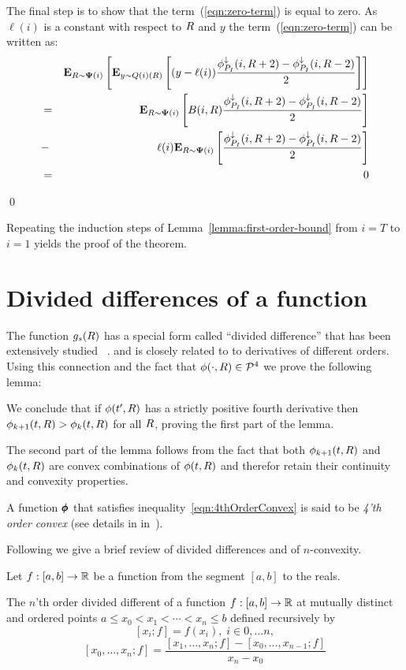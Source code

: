 \documentclass{article}[12pt]
\begin{document}
\begin{enumerate}
The final step is to show that the term~(\ref{eqn:zero-term}) is equal
to zero. As $\ell(i)$ is a constant with respect to $R$ and $y$ the
term~(\ref{eqn:zero-term}) can be written as:
\begin{eqnarray}
&&{\bf E}_{R \sim {\bf \Psi}(i)}\left[ {\bf E}_{y \sim Q(i)(R)}\left[ (y-\ell(i))
   \frac{\phi_{P_I}^{\downarrow}(i,R+2)-\phi_{P_I}^{\downarrow}(i,R-2)}{2} \right] \right]\\
&=&
{\bf E}_{R \sim {\bf \Psi}(i)}\left[ B(i,R)
    \frac{\phi_{P_I}^{\downarrow}(i,R+2)-\phi_{P_I}^{\downarrow}(i,R-2)}{2} \right]\\
  &-& \ell(i) {\bf E}_{R \sim {\bf \Psi}(i)}\left[ 
    \frac{\phi_{P_I}^{\downarrow}(i,R+2)-\phi_{P_I}^{\downarrow}(i,R-2)}{2} \right]\\
  &=& 0
\end{eqnarray}
\end{enumerate}
\qed

Repeating the induction steps of Lemma~\ref{lemma:first-order-bound}
from $i=T$ to $i=1$ yields the proof of the theorem.


\section{Divided differences of a function} \label{sec:divdiff}

The function $g_s(R)$ has a special form called ``divided difference''
that has been extensively studied ~\cite{popoviciu1965certaines,butt2016generalization, de2005divided}.
and is closely related to to derivatives of different orders. Using
this connection and the fact that $\phi(\cdot,R) \in {\cal P}^{4}$ we prove
the following lemma:


We conclude that if $\phi(t',R)$ has a strictly positive fourth
derivative then $\phi_{k+1}(t,R) > \phi_{k}(t,R)$ for all $R$, proving
the first part of the lemma.

The second part of the lemma follows from the fact that
both $\phi_{k+1}(t,R)$ and $\phi_{k}(t,R)$ are convex combinations of
$\phi(t,R)$ and therefor retain their continuity and convexity properties.

A function $\pmb{\phi}_{}$ that satisfies
inequality~\ref{eqn:4thOrderConvex} is said to be {\em 4'th order convex}
(see details in in~\cite{butt2016generalization}).


Following\cite{butt2016generalization} we give a brief review of
divided differences and of $n$-convexity.

Let $f:[a,b] \to \mathbb{R}$ be a function from the segment $[a,b]$ to the
reals.

\begin{definition}
  The $n$'th order divided different of a function $f:[a,b] \to
  \mathbb{R}$ at mutually distinct and ordered points $a \leq x_0 < x_1
  < \cdots < x_n \leq b$
  defined recursively by
  \[ [x_i; f] = f(x_i), \; i \in 0,\ldots n,\]
  \[ [x_0,\ldots,x_n;f] =
    \frac{[x_1,\ldots,x_n;f]-[x_0,\ldots,x_{n-1};f]}{x_n-x_0} \]
\end{definition}
\end{document}
